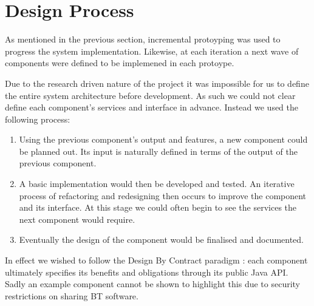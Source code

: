 \documentclass[a4paper,11pt]{report}
\begin{document}
\section{Design Process}
As mentioned in the previous section, incremental protoyping was used to progress the system implementation. Likewise, at each iteration a next wave of components were defined to be implemened in each protoype.

Due to the research driven nature of the project it was impossible for us to define the entire system architecture before development. As such we could not clear define each component's services and interface in advance. Instead we used the following process:
\begin{enumerate}
\item{Using the previous component's output and features, a new component could be planned out. Its input is naturally defined in terms of the output of the previous component.}
\item{A basic implementation would then be developed and tested. An iterative process of refactoring and redesigning then occurs to improve the component and its interface. At this stage we could often begin to see the services the next component would require.}
\item{Eventually the design of the component would be finalised and documented.}
\end{enumerate}
In effect we wished to follow the Design By Contract paradigm \cite{DesignByContract}: each component ultimately specifies its benefits and obligations through its public Java API. Sadly an example component cannot be shown to highlight this due to security restrictions on sharing BT software.
\end{document}
